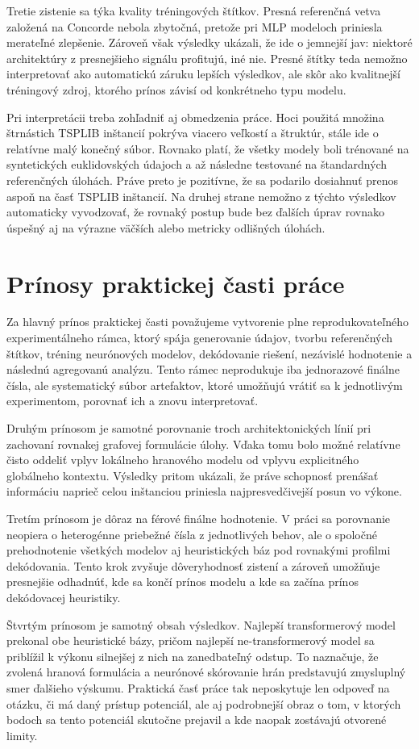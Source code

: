 \indent Tretie zistenie sa týka kvality tréningových štítkov. Presná referenčná
vetva založená na Concorde nebola zbytočná, pretože pri MLP modeloch priniesla
merateľné zlepšenie. Zároveň však výsledky ukázali, že ide o jemnejší jav:
niektoré architektúry z presnejšieho signálu profitujú, iné nie. Presné štítky
teda nemožno interpretovať ako automatickú záruku lepších výsledkov, ale skôr
ako kvalitnejší tréningový zdroj, ktorého prínos závisí od konkrétneho typu
modelu.

\indent Pri interpretácii treba zohľadniť aj obmedzenia práce. Hoci použitá
množina štrnástich TSPLIB inštancií pokrýva viacero veľkostí a štruktúr, stále
ide o relatívne malý konečný súbor. Rovnako platí, že všetky modely boli
trénované na syntetických euklidovských údajoch a až následne testované na
štandardných referenčných úlohách. Práve preto je pozitívne, že sa podarilo
dosiahnuť prenos aspoň na časť TSPLIB inštancií. Na druhej strane nemožno z
týchto výsledkov automaticky vyvodzovať, že rovnaký postup bude bez ďalších
úprav rovnako úspešný aj na výrazne väčších alebo metricky odlišných úlohách.

\section{Prínosy praktickej časti práce}
\indent Za hlavný prínos praktickej časti považujeme vytvorenie plne
reprodukovateľného experimentálneho rámca, ktorý spája generovanie údajov,
tvorbu referenčných štítkov, tréning neurónových modelov, dekódovanie riešení,
nezávislé hodnotenie a následnú agregovanú analýzu. Tento rámec neprodukuje iba
jednorazové finálne čísla, ale systematický súbor artefaktov, ktoré umožňujú
vrátiť sa k jednotlivým experimentom, porovnať ich a znovu interpretovať.

\indent Druhým prínosom je samotné porovnanie troch architektonických línií pri
zachovaní rovnakej grafovej formulácie úlohy. Vďaka tomu bolo možné relatívne
čisto oddeliť vplyv lokálneho hranového modelu od vplyvu explicitného globálneho
kontextu. Výsledky pritom ukázali, že práve schopnosť prenášať informáciu naprieč
celou inštanciou priniesla najpresvedčivejší posun vo výkone.

\indent Tretím prínosom je dôraz na férové finálne hodnotenie. V práci sa
porovnanie neopiera o heterogénne priebežné čísla z jednotlivých behov, ale o
spoločné prehodnotenie všetkých modelov aj heuristických báz pod rovnakými
profilmi dekódovania. Tento krok zvyšuje dôveryhodnosť zistení a zároveň
umožňuje presnejšie odhadnúť, kde sa končí prínos modelu a kde sa začína prínos
dekódovacej heuristiky.

\indent Štvrtým prínosom je samotný obsah výsledkov. Najlepší transformerový
model prekonal obe heuristické bázy, pričom najlepší ne-transformerový model sa
priblížil k výkonu silnejšej z nich na zanedbateľný odstup. To naznačuje, že
zvolená hranová formulácia a neurónové skórovanie hrán predstavujú zmysluplný
smer ďalšieho výskumu. Praktická časť práce tak neposkytuje len odpoveď na otázku,
či má daný prístup potenciál, ale aj podrobnejší obraz o tom, v ktorých bodoch
sa tento potenciál skutočne prejavil a kde naopak zostávajú otvorené limity.
